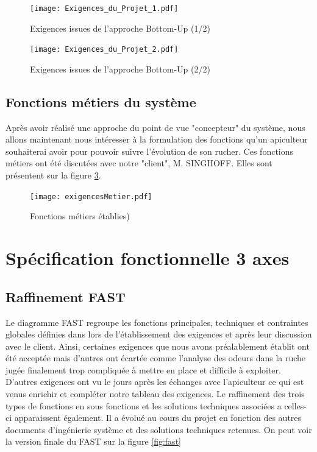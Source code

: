  
\begin{figure}[h!]
\centering\texttt{[image: Exigences\_du\_Projet\_1.pdf]}
\caption{\label{fig:exi1} Exigences issues de l'approche Bottom-Up (1/2)}
\end{figure}

 
\begin{figure}[h!]
\centering\texttt{[image: Exigences\_du\_Projet\_2.pdf]}
\caption{\label{fig:exi2} Exigences issues de l'approche Bottom-Up (2/2)}
\end{figure}

\clearpage

\section{Fonctions métiers du système}
\vspace{1.5cm}

Après avoir réalisé une approche du point de vue "concepteur" du système, nous allons maintenant nous intéresser à la formulation des fonctions qu'un apiculteur souhaiterai avoir pour pouvoir suivre l'évolution de son rucher. Ces fonctions métiers ont été discutées avec notre "client", M. SINGHOFF. Elles sont présentent sur la figure \ref{fig:fonctionsM}.

\begin{figure}[h!]
\centering\texttt{[image: exigencesMetier.pdf]}
\caption{\label{fig:fonctionsM} Fonctions métiers établies)}
\end{figure} 

\chapter{Spécification fonctionnelle  3 axes}

\section{Raffinement FAST}
\vspace{1.5cm}
Le diagramme FAST regroupe les fonctions principales, techniques et contraintes globales définies dans lors de 
l'établissement des exigences et après leur discussion avec le client. Ainsi, certaines exigences que nous avons préalablement établit ont été acceptée mais d'autres ont écartée comme l'analyse des odeurs dans la ruche jugée finalement trop compliquée à mettre en place et difficile à exploiter. D'autres exigences ont vu le jours après les échanges avec l'apiculteur ce qui est venus enrichir et compléter notre tableau des exigences. Le raffinement des trois types de fonctions en sous fonctions et les solutions techniques 
associées a celles-ci apparaissent également. Il a évolué au cours du projet en fonction des autres documents 
d'ingénierie système et des solutions techniques retenues. 
On peut voir la version finale du FAST sur la figure \ref{fig:fast}

